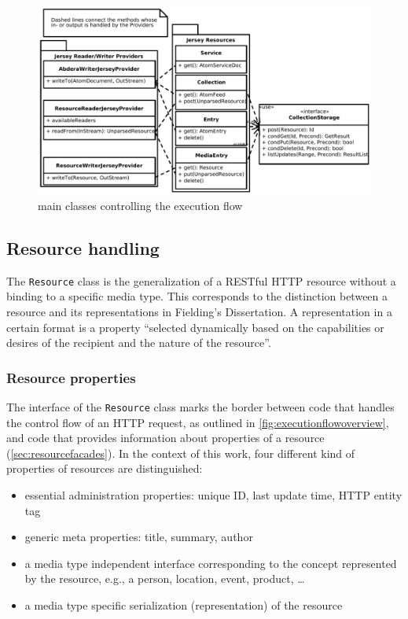 \documentclass[11pt,a4paper,headsepline,twoside]{scrartcl}		%
\begin{document}
\begin{figure}[htb]
  \advance\leftskip-1cm
  \includegraphics[width=1.2\textwidth]{executionflowoverview}

  \caption{main classes controlling the execution flow}
  \label{fig:executionflowoverview}
\end{figure}

\subsection{Resource handling}
\label{sec:resource-handling}

The \lstinline:Resource: class is the generalization of a RESTful HTTP resource
without a binding to a specific media type. This corresponds to the distinction
between a resource and its representations in Fielding's
Dissertation\cite[sec. 5.2.1.1]{Fielding2000}. A representation in a certain
format is a property ``selected dynamically based on the capabilities or desires of
the recipient and the nature of the
resource''\cite[p. 87]{Fielding2000}.

\subsubsection{Resource properties}
\label{sec:resource-properties}

The interface of the \lstinline:Resource: class marks the border between code
that handles the control flow of an HTTP request, as outlined in
\autoref{fig:executionflowoverview}, and code that provides information about
properties of a resource (\autoref{sec:resourcefacades}). In the context of this
work, four different kind of properties of resources are distinguished:

\begin{itemize}
\item essential administration properties: unique ID, last update time, HTTP
  entity tag
\item generic meta properties: title, summary, author
\item a media type independent interface corresponding to the concept represented
  by the resource, e.g., a person, location, event, product, \ldots
\item a media type specific serialization (representation) of the resource
\end{itemize}
\end{document}

